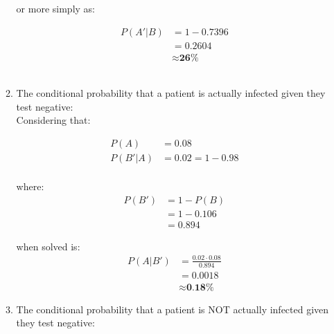 \documentclass{article}
\begin{document}
\begin{enumerate}
\begin{enumerate}
        or more simply as:

        \begin{equation}
        \begin{split}
            P(A'|B) &= 1 - 0.7396\\
            &= 0.2604\\
            & \approx \textbf{26\%}
        \end{split}            
        \end{equation}\\

        \item The conditional probability that a patient is actually infected given they test negative:\\

        Considering that:

        \begin{equation}
        \begin{split}
            P(A) &= 0.08\\
            P(B'|A) &= 0.02 = 1 - 0.98\\
        \end{split}
        \end{equation}

        where:
        \begin{equation}
        \begin{split}
            P(B') &= 1 - P(B)\\
            &= 1 - 0.106\\
            &= 0.894
        \end{split}
        \end{equation}

        when solved is:
        \begin{equation}
        \begin{split}
            P(A|B') &= \frac{0.02 \cdot 0.08}{0.894}\\
            &= 0.0018\\
            & \approx \textbf{0.18\%}
        \end{split}            
        \end{equation}

        \item The conditional probability that a patient is NOT actually infected given they test negative:\\


\end{enumerate}
\end{enumerate}
\end{document}
